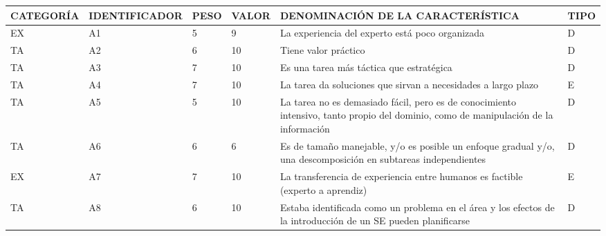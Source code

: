 \documentclass[a4paper,12pt]{article}
\begin{document}
\begin{table}[h]
	\centering
	\begin{tabular}{|l|l|l|l|p{4cm}|l|}
		\hline
		\scriptsize CATEGORÍA & \scriptsize IDENTIFICADOR & \scriptsize PESO & \scriptsize VALOR & \scriptsize DENOMINACIÓN DE LA CARACTERÍSTICA                                                                                       & \scriptsize TIPO \\ \hline
		EX                    & A1                        & 5                & 9                 & La experiencia del experto está poco organizada                                                                                     & D                \\ \hline
		TA                    & A2                        & 6                & 10                & Tiene valor práctico                                                                                                                & D                \\ \hline
		TA                    & A3                        & 7                & 10                & Es una tarea más táctica que estratégica                                                                                            & D                \\ \hline
		TA                    & A4                        & 7                & 10                & La tarea da soluciones que sirvan a necesidades a largo plazo                                                                       & E                \\ \hline
		TA                    & A5                        & 5                & 10                & La tarea no es demasiado fácil, pero es de conocimiento intensivo, tanto propio del dominio, como de manipulación de la información & D                \\ \hline
		TA                    & A6                        & 6                & 6                 & Es de tamaño manejable, y/o es posible un enfoque gradual y/o, una descomposición en subtareas independientes                       & D                \\ \hline
		EX                    & A7                        & 7                & 10                & La transferencia de experiencia entre humanos es factible (experto a aprendiz)                                                      & E                \\ \hline
		TA                    & A8                        & 6                & 10                & Estaba identificada como un problema en el área y los efectos de la introducción de un SE pueden planificarse                       & D                \\ \hline

\end{tabular}
\end{table}
\end{document}

